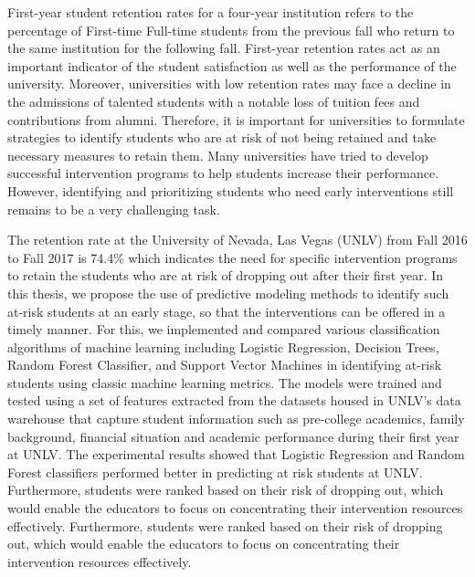 \documentclass[11pt,openright]{report}
\begin{document}
\thesistitlepage
\copyrightpage

\newpage

\electronicapprovalpage


\begin{thesisabstract}
First-year student retention rates for a four-year institution refers to the percentage of First-time Full-time students from the previous fall who return to the same institution for the following fall. First-year retention rates act as an important indicator of the student satisfaction as well as the performance of the university. Moreover, universities with low retention rates may face a decline in the admissions of talented students with a notable loss of tuition fees and contributions from alumni. Therefore, it is important for universities to formulate strategies to identify students who are at risk of not being retained and take necessary measures to retain them. Many universities have tried to develop successful intervention programs to help students increase their performance. However, identifying and prioritizing students who need early interventions still remains to be a very challenging task.    

The retention rate at the University of Nevada, Las Vegas (UNLV) from Fall 2016 to Fall 2017 is 74.4\% which indicates the need for specific intervention programs to retain the students who are at risk of dropping out after their first year. In this thesis, we propose the use of predictive modeling methods to identify such at-risk students at an early stage, so that the interventions can be offered in a timely manner. For this, we implemented and compared various classification algorithms of machine learning including Logistic Regression, Decision Trees, Random Forest Classifier, and Support Vector Machines in identifying at-risk students using classic machine learning metrics. The models were trained and tested using a set of features extracted from the datasets housed in UNLV's data warehouse that capture student information such as pre-college academics, family background, financial situation and academic performance during their first year at UNLV. The experimental results showed that Logistic Regression and Random Forest classifiers performed better in predicting at risk students at UNLV. Furthermore, students were ranked based on their risk of dropping out, which would enable the educators to focus on concentrating their intervention resources effectively. Furthermore, students were ranked based
on their risk of dropping out, which would enable the educators to focus on concentrating their
intervention resources effectively.

\end{thesisabstract}
\end{document}
